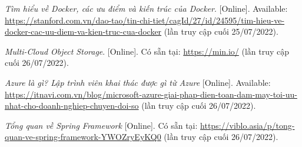 \documentclass[../Main.tex]{subfiles}
\begin{document}
\cite{Docker} \textit{Tìm hiểu về Docker, các ưu điểm và kiến trúc của Docker}. [Online]. Available: \url{https://stanford.com.vn/dao-tao/tin-chi-tiet/cagId/27/id/24595/tim-hieu-ve-docker-cac-uu-diem-va-kien-truc-cua-docker} (lần truy cập cuối
25/07/2022). 

\cite{Minio} \textit{Multi-Cloud Object Storage}. [Online]. Có sẵn tại: \url{https://min.io/} (lần truy cập cuối 26/07/2022).

\cite{Azure} \textit{Azure là gì? Lập trình viên khai thác được gì từ Azure} [Online]. Available: \url{https://itnavi.com.vn/blog/microsoft-azure-giai-phap-dien-toan-dam-may-toi-uu-nhat-cho-doanh-nghiep-chuyen-doi-so}  (lần truy cập cuối 26/07/2022).

\cite{Spring} \textit{Tổng quan về Spring Framework} [Online]. Có sẵn tại: \url{https://viblo.asia/p/tong-quan-ve-spring-framework-YWOZryEyKQ0}  (lần truy cập cuối 26/07/2022).
\end{document}
